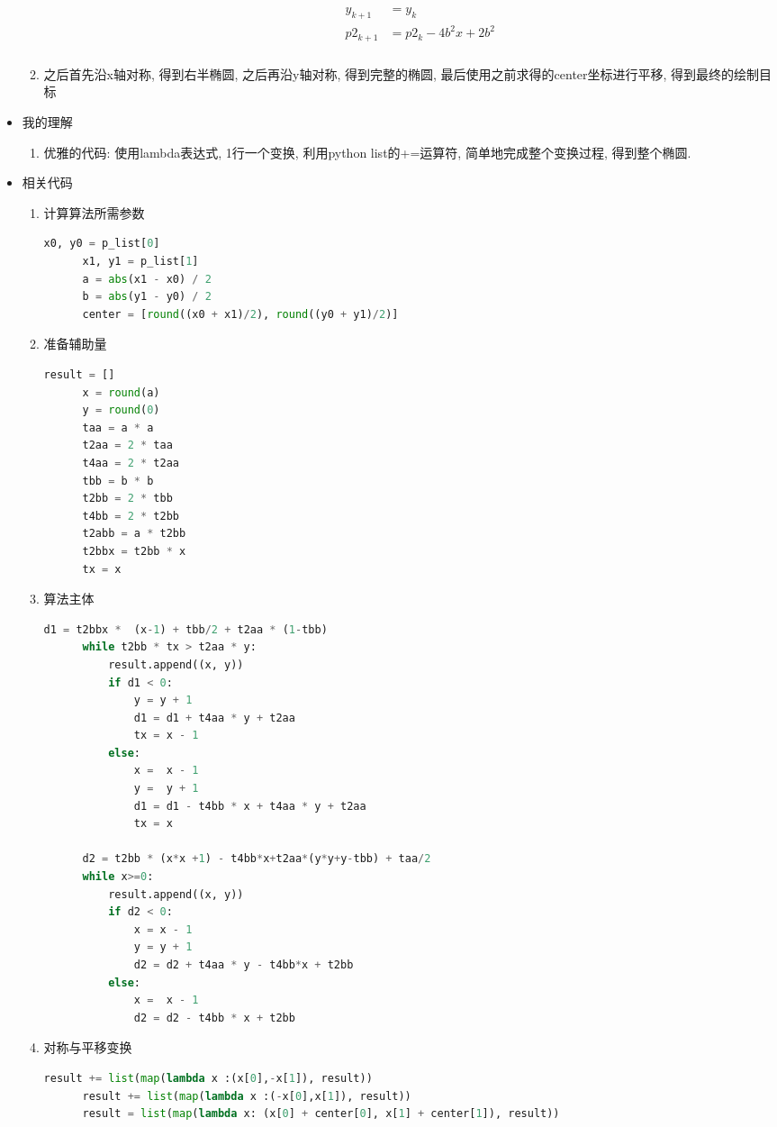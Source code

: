 \documentclass[a4paper,UTF8]{article}
\theoremstyle{definition}
\begin{document}
\begin{itemize}
\begin{enumerate}
\begin{enumerate}
\begin{align}
\begin{split}
          y_{k+1} &= y_k\\
          p2_{k+1} &= p2_{k} - 4b^2x + 2b^2\\
        \end{split}
      \end{align}
    \end{enumerate}
    \item 之后首先沿x轴对称, 得到右半椭圆, 之后再沿y轴对称, 得到完整的椭圆, 最后使用之前求得的center坐标进行平移, 得到最终的绘制目标
  \end{enumerate}
  \item 我的理解\begin{enumerate}
    \item 优雅的代码: 使用lambda表达式, 1行一个变换, 利用python list的+=运算符, 简单地完成整个变换过程, 得到整个椭圆.
  \end{enumerate}
  \item 相关代码\begin{enumerate}
    \item 计算算法所需参数
    \begin{lstlisting}[language={Python}] 
      x0, y0 = p_list[0]
      x1, y1 = p_list[1]
      a = abs(x1 - x0) / 2
      b = abs(y1 - y0) / 2
      center = [round((x0 + x1)/2), round((y0 + y1)/2)]\end{lstlisting}
    \item 准备辅助量
    \begin{lstlisting}[language={Python}] 
      result = []
      x = round(a)
      y = round(0)
      taa = a * a
      t2aa = 2 * taa
      t4aa = 2 * t2aa
      tbb = b * b
      t2bb = 2 * tbb
      t4bb = 2 * t2bb
      t2abb = a * t2bb
      t2bbx = t2bb * x
      tx = x\end{lstlisting}
    \item 算法主体
    \begin{lstlisting}[language={Python}] 
      d1 = t2bbx *  (x-1) + tbb/2 + t2aa * (1-tbb)
      while t2bb * tx > t2aa * y:
          result.append((x, y))
          if d1 < 0:
              y = y + 1
              d1 = d1 + t4aa * y + t2aa
              tx = x - 1
          else:
              x =  x - 1
              y =  y + 1
              d1 = d1 - t4bb * x + t4aa * y + t2aa
              tx = x
      
      d2 = t2bb * (x*x +1) - t4bb*x+t2aa*(y*y+y-tbb) + taa/2
      while x>=0:
          result.append((x, y))
          if d2 < 0:
              x = x - 1
              y = y + 1
              d2 = d2 + t4aa * y - t4bb*x + t2bb
          else:
              x =  x - 1
              d2 = d2 - t4bb * x + t2bb\end{lstlisting}
    \item 对称与平移变换
    \begin{lstlisting}[language={Python}] 
      result += list(map(lambda x :(x[0],-x[1]), result))
      result += list(map(lambda x :(-x[0],x[1]), result))
      result = list(map(lambda x: (x[0] + center[0], x[1] + center[1]), result))\end{lstlisting}
  \end{enumerate}
\end{itemize}
\end{document}
